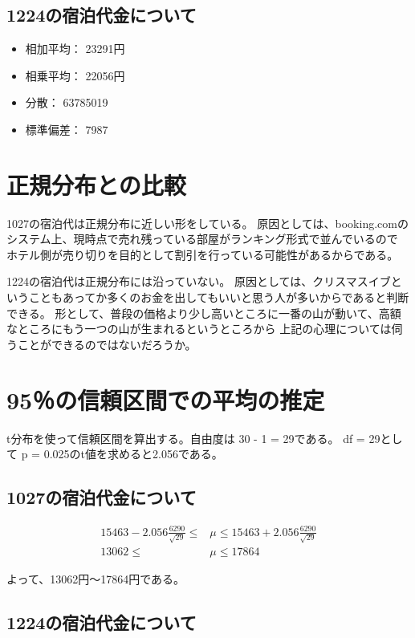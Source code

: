 \documentclass[11pt,a4j]{jsarticle}
\begin{document}
\subsection{1224の宿泊代金について}

\begin{itemize}
  \item 相加平均： 23291円
  \item 相乗平均： 22056円
  \item 分散： 63785019
  \item 標準偏差： 7987
\end{itemize}

\section{正規分布との比較}

1027の宿泊代は正規分布に近しい形をしている。
原因としては、booking.comのシステム上、現時点で売れ残っている部屋がランキング形式で並んでいるので
ホテル側が売り切りを目的として割引を行っている可能性があるからである。

1224の宿泊代は正規分布には沿っていない。
原因としては、クリスマスイブということもあってか多くのお金を出してもいいと思う人が多いからであると判断できる。
形として、普段の価格より少し高いところに一番の山が動いて、高額なところにもう一つの山が生まれるというところから
上記の心理については伺うことができるのではないだろうか。

\section{95％の信頼区間での平均の推定}

t分布を使って信頼区間を算出する。自由度は 30 - 1 = 29である。
df = 29として p = 0.025のt値を求めると2.056である。

\subsection{1027の宿泊代金について}

\begin{align*}
  15463 - 2.056 \frac{6290}{\sqrt{29}} \leq &\mu \leq 15463 + 2.056 \frac{6290}{\sqrt{29}} \\
  13062 \leq &\mu \leq 17864
\end{align*}

よって、13062円〜17864円である。

\subsection{1224の宿泊代金について}
\end{document}
